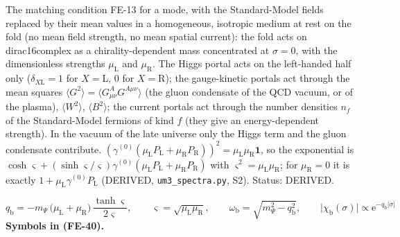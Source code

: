 \documentclass[
  10pt,
]{article}
\begin{document}
The matching condition FE-13 for a mode, with the Standard-Model fields
replaced by their mean values in a homogeneous, isotropic medium at rest
on the fold (no mean field strength, no mean spatial current): the fold
acts on dirac16complex as a chirality-dependent mass concentrated at
\(\sigma = 0\), with the dimensionless strengths \(\mu_{\mathrm{L}}\)
and \(\mu_{\mathrm{R}}\). The Higgs portal acts on the left-handed half
only (\(\delta_{X\mathrm{L}} = 1\) for \(X = \mathrm{L}\), 0 for
\(X = \mathrm{R}\)); the gauge-kinetic portals act through the mean
squares \(\langle G^2\rangle = \langle G^A_{\mu\nu}G^{A\mu\nu}\rangle\)
(the gluon condensate of the QCD vacuum, or of the plasma),
\(\langle W^2\rangle\), \(\langle B^2\rangle\); the current portals act
through the number densities \(n_f\) of the Standard-Model fermions of
kind \(f\) (they give an energy-dependent strength). In the vacuum of
the late universe only the Higgs term and the gluon condensate
contribute.
\((\gamma^{(0)}(\mu_{\mathrm{L}}P_{\mathrm{L}} + \mu_{\mathrm{R}}P_{\mathrm{R}}))^2 = \mu_{\mathrm{L}}\mu_{\mathrm{R}}\mathbf{1}\),
so the exponential is
\(\cosh\varsigma + (\sinh\varsigma/\varsigma)\gamma^{(0)}(\mu_{\mathrm{L}}P_{\mathrm{L}} + \mu_{\mathrm{R}}P_{\mathrm{R}})\)
with \(\varsigma^2 = \mu_{\mathrm{L}}\mu_{\mathrm{R}}\); for
\(\mu_{\mathrm{R}} = 0\) it is exactly
\(1 + \mu_{\mathrm{L}}\gamma^{(0)}P_{\mathrm{L}}\) (DERIVED,
\texttt{um3\_spectra.py}, S2). Status: DERIVED.

\[
q_{\mathrm{b}} = -m_\Psi\,\big(\mu_{\mathrm{L}} + \mu_{\mathrm{R}}\big)\,\frac{\tanh\varsigma}{2\varsigma},\qquad \varsigma = \sqrt{\mu_{\mathrm{L}}\mu_{\mathrm{R}}},\qquad
\omega_{\mathrm{b}} = \sqrt{m_\Psi^2 - q_{\mathrm{b}}^2},\qquad \lvert\chi_{\mathrm{b}}(\sigma)\rvert \propto \mathrm{e}^{-q_{\mathrm{b}}\lvert\sigma\rvert} \tag{FE-40}
\] \textbf{Symbols in (FE-40).}
\end{document}
